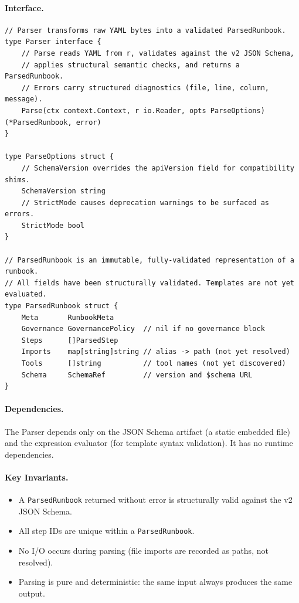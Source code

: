 \paragraph{Interface.}

\begin{verbatim}
// Parser transforms raw YAML bytes into a validated ParsedRunbook.
type Parser interface {
    // Parse reads YAML from r, validates against the v2 JSON Schema,
    // applies structural semantic checks, and returns a ParsedRunbook.
    // Errors carry structured diagnostics (file, line, column, message).
    Parse(ctx context.Context, r io.Reader, opts ParseOptions) (*ParsedRunbook, error)
}

type ParseOptions struct {
    // SchemaVersion overrides the apiVersion field for compatibility shims.
    SchemaVersion string
    // StrictMode causes deprecation warnings to be surfaced as errors.
    StrictMode bool
}

// ParsedRunbook is an immutable, fully-validated representation of a runbook.
// All fields have been structurally validated. Templates are not yet evaluated.
type ParsedRunbook struct {
    Meta       RunbookMeta
    Governance GovernancePolicy  // nil if no governance block
    Steps      []ParsedStep
    Imports    map[string]string // alias -> path (not yet resolved)
    Tools      []string          // tool names (not yet discovered)
    Schema     SchemaRef         // version and $schema URL
}
\end{verbatim}

\paragraph{Dependencies.}
The Parser depends only on the JSON Schema artifact (a static embedded file) and the expression
evaluator (for template syntax validation). It has no runtime dependencies.

\paragraph{Key Invariants.}
\begin{itemize}
  \item A \texttt{ParsedRunbook} returned without error is structurally valid against the v2 JSON Schema.
  \item All step IDs are unique within a \texttt{ParsedRunbook}.
  \item No I/O occurs during parsing (file imports are recorded as paths, not resolved).
  \item Parsing is pure and deterministic: the same input always produces the same output.
\end{itemize}

